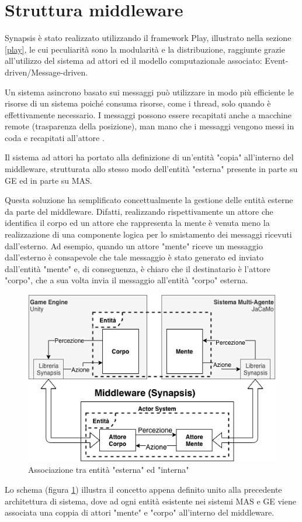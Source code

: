 \section{Struttura middleware} \label{struttura_middleware}

Synapsis è stato realizzato utilizzando il framework Play, illustrato nella sezione \ref{play}, le cui peculiarità sono la modularità e la distribuzione, raggiunte grazie all'utilizzo del sistema ad attori ed il modello computazionale associato: Event-driven/Message-driven. 

\medskip

Un sistema asincrono basato sui messaggi può utilizzare in modo più efficiente le risorse di un sistema poiché consuma risorse, come i thread, solo quando è effettivamente necessario. I messaggi possono essere recapitati anche a macchine remote (trasparenza della posizione), man mano che i messaggi vengono messi in coda e recapitati all'attore \cite{akka-book}.

\medskip

Il sistema ad attori ha portato alla definizione di un'entità "copia" all'interno del middleware, strutturata allo stesso modo dell'entità "esterna" presente in parte su GE ed in parte su MAS.

\medskip

Questa soluzione ha semplificato concettualmente la gestione delle entità esterne da parte del middleware. Difatti, realizzando rispettivamente un attore che identifica il corpo ed un attore che rappresenta la mente è venuta meno la realizzazione di una componente logica per lo smistamento dei messaggi ricevuti dall'esterno. Ad esempio, quando un attore "mente" riceve un messaggio dall'esterno è consapevole che tale messaggio è stato generato ed inviato dall'entità "mente" e, di conseguenza, è chiaro che il destinatario è l'attore "corpo", che a sua volta invia il messaggio all'entità "corpo" esterna.

\begin{figure}[H]
\centering
\includegraphics[width=\textwidth]{figures/Middleware_associazione_entita.png}
\caption{Associazione tra entità "esterna" ed "interna"}
\label{middleware_associazione_entita}
\end{figure}

Lo schema (figura \ref{middleware_associazione_entita}) illustra il concetto appena definito unito alla precedente architettura di sistema, dove ad ogni entità esistente nei sistemi MAS e GE viene associata una coppia di attori "mente" e "corpo" all'interno del middleware.
